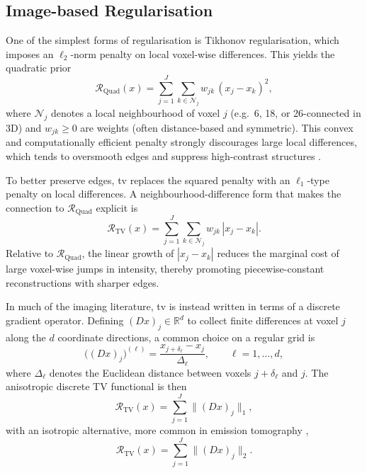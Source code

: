\subsection{Image-based Regularisation}
One of the simplest forms of regularisation is Tikhonov regularisation, which imposes an $\ell_2$-norm penalty on local voxel-wise differences. This yields the quadratic prior
\begin{equation}
    \mathcal{R}_{\mathrm{Quad}}(x)
    = \sum_{j=1}^J \sum_{k \in \mathcal{N}_j} w_{jk}\, (x_j - x_k)^2,
\end{equation}
where $\mathcal{N}_j$ denotes a local neighbourhood of voxel $j$ (e.g.\ 6, 18, or 26-connected in 3D) and $w_{jk}\ge 0$ are weights (often distance-based and symmetric). This convex and computationally efficient penalty strongly discourages large local differences, which tends to oversmooth edges and suppress high-contrast structures \cite{gemanStochasticRelaxationGibbs1984}.

To better preserve edges, \gls{tv} \cite{rudinNonlinearTotalVariation1992} replaces the squared penalty with an $\ell_1$-type penalty on local differences. A neighbourhood-difference form that makes the connection to $\mathcal{R}_{\mathrm{Quad}}$ explicit is
\begin{equation}
    \mathcal{R}_{\mathrm{TV}}(x)
    = \sum_{j=1}^J \sum_{k \in \mathcal{N}_j} w_{jk}\, |x_j - x_k|.
\end{equation}
Relative to $\mathcal{R}_{\mathrm{Quad}}$, the linear growth of $|x_j-x_k|$ reduces the marginal cost of large voxel-wise jumps in intensity, thereby promoting piecewise-constant reconstructions with sharper edges.

In much of the imaging literature, \gls{tv} is instead written in terms of a discrete gradient operator. Defining $(D x)_j \in \mathbb{R}^d$ to collect finite differences at voxel $j$ along the $d$ coordinate directions, a common choice on a regular grid is
\begin{equation}
    \big((D x)_j\big)^{(\ell)}
    = \frac{x_{j+\delta_\ell} - x_{j}}{\Delta_{\ell}},
    \qquad \ell=1,\dots,d,
    \label{eq:finite_difference}
\end{equation}
where $\Delta_\ell$ denotes the Euclidean distance between voxels $j+\delta_\ell$ and $j$. The anisotropic discrete TV functional is then
\begin{equation}
    \mathcal{R}_{\mathrm{TV}}(x)
    = \sum_{j=1}^J \|(D x)_j\|_1,
\end{equation}
with an isotropic alternative, more common in emission tomography \cite{jonssonTotalVariationRegularization1998, paninTotalVariationRegulated1999},
\begin{equation}\label{eq:tv}
        \mathcal{R}_{\mathrm{TV}}(x)
    = \sum_{j=1}^J \|(D x)_j\|_2.
\end{equation}

